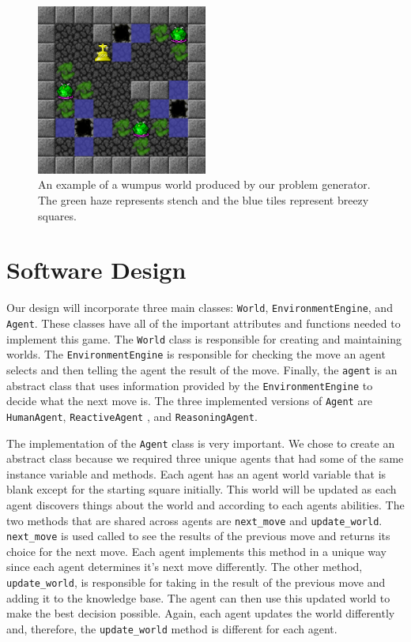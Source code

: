 \documentclass{article}
\begin{document}
		\begin{figure}
			\centering
			\includegraphics[width=0.5\textwidth]{images/ex_ww}
			\caption{An example of a wumpus world produced by our problem generator. The green haze represents stench and the blue tiles represent breezy squares.}
			\label{ex_ww}
		\end{figure}

	
	\section{Software Design}
		Our design will incorporate three main classes: \texttt{World}, \texttt{EnvironmentEngine}, and \texttt{Agent}. 
		These classes have all of the important attributes and functions needed to implement this game.
		The \texttt{World} class is responsible for creating and maintaining worlds.
		The \texttt{EnvironmentEngine} is responsible for checking the move an agent selects and then telling the agent the result of the move.
		Finally, the \texttt{agent} is an abstract class that uses information provided by the \texttt{EnvironmentEngine} to decide what the next move is. The three implemented versions of \texttt{Agent} are \texttt{HumanAgent}, \texttt{ReactiveAgent} , and \texttt{ReasoningAgent}.
		
		
		
	
		
		The implementation of the  \texttt{Agent} class is very important. 
		We chose to create an abstract class because we required three unique agents that had some of the same instance variable and methods. Each agent has an agent world variable that is blank except for the starting square initially. 
		This world will be updated as each agent discovers things about the world and according to each agents abilities. 
		The two methods that are shared across agents are \texttt{next\_move} and \texttt{update\_world}. 
		\texttt{next\_move} is used called to see the results of the previous move and returns its choice for the next move. 
		Each agent implements this method in a unique way since each agent determines it's next move differently. 
		The other method, \texttt{update\_world}, is responsible for taking in the result of the previous move and adding it to the knowledge base. 
		The agent can then use this updated world to make the best decision possible. 
		Again, each agent updates the world differently and, therefore, the \texttt{update\_world} method is different for each agent.
		
\end{document}
